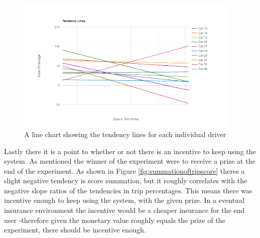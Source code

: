 \begin{figure}[tb]
\centering
\includegraphics[width=0.95\textwidth]{Pictures/tendenslinjer}
\caption{A line chart showing the tendency lines for each individual driver}
\label{fig:tendencylines}
\end{figure}

Lastly there it is a point to whether or not there is an incentive to keep using the system. As mentioned the winner of the experiment were to receive a prize at the end of the experiment. As shown in Figure \ref{fig:summationoftripscore} theres a slight negative tendency is score summation, but it roughly correlates with the negative slope ratios of the tendencies in trip percentages. This means there was incentive enough to keep using the system, with the given prize. In a eventual insurance environment the incentive would be a cheaper insurance for the end user -therefore given the monetary value roughly equals the prize of the experiment, there should be incentive enough.


 